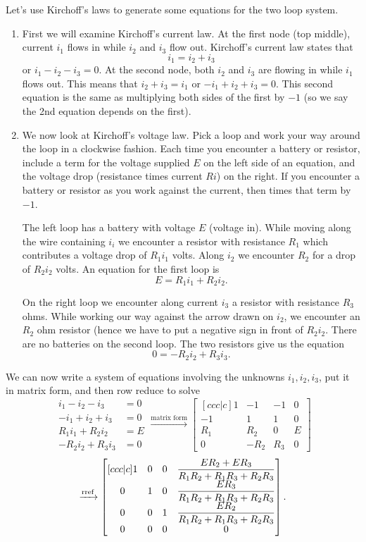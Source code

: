 Let's use Kirchoff's laws to generate some equations for the two loop system. 
\begin{enumerate}
	\item First we will examine Kirchoff's current law. 
	At the first node (top middle), current $i_1$ flows in while $i_2$ and $i_3$ flow out. 
	Kirchoff's current law states that 
	$$i_1=i_2+i_3$$ or $i_1-i_2-i_3=0$.  
	At the second node, both $i_2$ and $i_3$ are flowing in while $i_1$ flows out. 
	This means that $i_2+i_3=i_1$ or $-i_1+i_2+i_3=0$. 
	This second equation is the same as multiplying both sides of the first by $-1$ (so we say the 2nd equation depends on the first). 
	\item We now look at Kirchoff's voltage law. 
	Pick a loop and work your way around the loop in a clockwise fashion. 
	Each time you encounter a battery or resistor, include a term for the voltage supplied $E$ on the left side of an equation, and the voltage drop (resistance times current $Ri$) on the right. 
	If you encounter a battery or resistor as you work against the current, then times that term by $-1$. 
	
	The left loop has a battery with voltage $E$ (voltage in). 
	While moving along the wire containing $i_i$ we encounter a resistor with resistance $R_1$ which contributes a voltage drop of $R_1i_1$ volts. 
	Along $i_2$ we encounter $R_2$ for a drop of $R_2i_2$ volts. An equation for the first loop is 
	$$E=R_1i_1+R_2i_2.$$
	 
	On the right loop we encounter along current $i_3$ a resistor with resistance $R_3$ ohms.  
	While working our way against the arrow drawn on $i_2$, we encounter an $R_2$ ohm resistor (hence we have to put a negative sign in front of $R_2i_2$. 
	There are no batteries on the second loop. The two resistors give us the equation $$0=-R_2 i_2 +R_3i_3.$$ 
\end{enumerate}
We can now write a system of equations involving the unknowns $i_1,i_2,i_3$, put it in matrix form, and then row reduce to solve
$$
\begin{array}{rl}
i_1-i_2-i_3&=0\\
-i_1+i_2+i_3&=0\\
R_1i_1+R_2i_2&=E\\
-R_2 i_2 +R_3i_3&=0
\end{array}
\xrightarrow{\text{matrix form}}
\begin{bmatrix}[ccc|c]
1&-1&-1&0\\
-1&1&1&0\\
R_1&R_2&0&E\\
0&-R_2&R_3&0
\end{bmatrix}
$$$$
\xrightarrow{\operatorname{rref}}
\begin{bmatrix}[ccc|c]
 1 & 0 & 0 & \dfrac{E R_2+ E R_3}{R_1 R_2+R_1 R_3+R_2R_3} \\
 0 & 1 & 0 & \dfrac{E R_3}{R_1 R_2+R_1 R_3+R_2R_3} \\
 0 & 0 & 1 & \dfrac{E R_2}{R_1 R_2+R_1 R_3+R_2R_3} \\
 0 & 0 & 0 & 0
\end{bmatrix}.
$$
